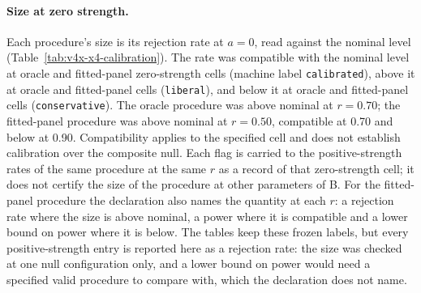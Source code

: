 \paragraph{Size at zero strength.}
Each procedure's size is its rejection rate at $a=0$, read against the nominal level  (Table~\ref{tab:v4x-x4-calibration}). The rate was compatible with the nominal level at  oracle and  fitted-panel zero-strength cells (machine label \texttt{calibrated}), above it at  oracle and  fitted-panel cells (\texttt{liberal}), and below it at  oracle and  fitted-panel cells (\texttt{conservative}). The oracle procedure was above nominal at $r=0.70$; the fitted-panel procedure was above nominal at $r=0.50$, compatible at 0.70 and below at 0.90. Compatibility applies to the specified cell and does not establish calibration over the composite null. Each flag is carried to the positive-strength rates of the same procedure at the same $r$ as a record of that zero-strength cell; it does not certify the size of the procedure at other parameters of B. For the fitted-panel procedure the declaration also names the quantity at each $r$: a rejection rate where the size is above nominal, a power where it is compatible and a lower bound on power where it is below. The tables keep these frozen labels, but every positive-strength entry is reported here as a rejection rate: the size was checked at one null configuration only, and a lower bound on power would need a specified valid procedure to compare with, which the declaration does not name.

